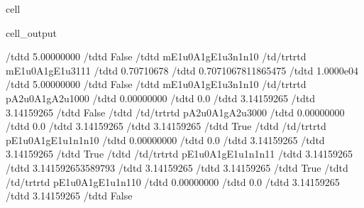 \documentclass[letterpaper,table,10pt,english]{jupyterBook}
\begin{document}
\begin{sphinxuseclass}{cell}
\begin{sphinxVerbatimOutput}
\begin{sphinxuseclass}{cell_output}
\begin{sphinxVerbatim}[commandchars=\\\{\}]
\PYGZlt{}/td\PYGZgt{}\PYGZlt{}td\PYGZgt{}  5.00000000 \PYGZlt{}/td\PYGZgt{}\PYGZlt{}td\PYGZgt{} False \PYGZlt{}/td\PYGZgt{}\PYGZlt{}td\PYGZgt{} m\PYGZus{}E1u\PYGZus{}0\PYGZus{}A1g\PYGZus{}E1u\PYGZus{}3\PYGZus{}n1\PYGZus{}n1\PYGZus{}0 \PYGZlt{}/td\PYGZgt{}\PYGZlt{}/tr\PYGZgt{}\PYGZlt{}tr\PYGZgt{}\PYGZlt{}td\PYGZgt{} m\PYGZus{}E1u\PYGZus{}0\PYGZus{}A1g\PYGZus{}E1u\PYGZus{}3\PYGZus{}1\PYGZus{}1\PYGZus{}1 \PYGZlt{}/td\PYGZgt{}\PYGZlt{}td\PYGZgt{}  0.70710678 \PYGZlt{}/td\PYGZgt{}\PYGZlt{}td\PYGZgt{} 0.7071067811865475 \PYGZlt{}/td\PYGZgt{}\PYGZlt{}td\PYGZgt{}  1.0000e\PYGZhy{}04 \PYGZlt{}/td\PYGZgt{}\PYGZlt{}td\PYGZgt{}  5.00000000 \PYGZlt{}/td\PYGZgt{}\PYGZlt{}td\PYGZgt{} False \PYGZlt{}/td\PYGZgt{}\PYGZlt{}td\PYGZgt{} m\PYGZus{}E1u\PYGZus{}0\PYGZus{}A1g\PYGZus{}E1u\PYGZus{}3\PYGZus{}n1\PYGZus{}n1\PYGZus{}0 \PYGZlt{}/td\PYGZgt{}\PYGZlt{}/tr\PYGZgt{}\PYGZlt{}tr\PYGZgt{}\PYGZlt{}td\PYGZgt{} p\PYGZus{}A2u\PYGZus{}0\PYGZus{}A1g\PYGZus{}A2u\PYGZus{}1\PYGZus{}0\PYGZus{}0\PYGZus{}0 \PYGZlt{}/td\PYGZgt{}\PYGZlt{}td\PYGZgt{}  0.00000000 \PYGZlt{}/td\PYGZgt{}\PYGZlt{}td\PYGZgt{} 0.0 \PYGZlt{}/td\PYGZgt{}\PYGZlt{}td\PYGZgt{} \PYGZhy{}3.14159265 \PYGZlt{}/td\PYGZgt{}\PYGZlt{}td\PYGZgt{}  3.14159265 \PYGZlt{}/td\PYGZgt{}\PYGZlt{}td\PYGZgt{} False \PYGZlt{}/td\PYGZgt{}\PYGZlt{}td\PYGZgt{}  \PYGZlt{}/td\PYGZgt{}\PYGZlt{}/tr\PYGZgt{}\PYGZlt{}tr\PYGZgt{}\PYGZlt{}td\PYGZgt{} p\PYGZus{}A2u\PYGZus{}0\PYGZus{}A1g\PYGZus{}A2u\PYGZus{}3\PYGZus{}0\PYGZus{}0\PYGZus{}0 \PYGZlt{}/td\PYGZgt{}\PYGZlt{}td\PYGZgt{}  0.00000000 \PYGZlt{}/td\PYGZgt{}\PYGZlt{}td\PYGZgt{} 0.0 \PYGZlt{}/td\PYGZgt{}\PYGZlt{}td\PYGZgt{} \PYGZhy{}3.14159265 \PYGZlt{}/td\PYGZgt{}\PYGZlt{}td\PYGZgt{}  3.14159265 \PYGZlt{}/td\PYGZgt{}\PYGZlt{}td\PYGZgt{} True \PYGZlt{}/td\PYGZgt{}\PYGZlt{}td\PYGZgt{}  \PYGZlt{}/td\PYGZgt{}\PYGZlt{}/tr\PYGZgt{}\PYGZlt{}tr\PYGZgt{}\PYGZlt{}td\PYGZgt{} p\PYGZus{}E1u\PYGZus{}0\PYGZus{}A1g\PYGZus{}E1u\PYGZus{}1\PYGZus{}n1\PYGZus{}n1\PYGZus{}0 \PYGZlt{}/td\PYGZgt{}\PYGZlt{}td\PYGZgt{}  0.00000000 \PYGZlt{}/td\PYGZgt{}\PYGZlt{}td\PYGZgt{} 0.0 \PYGZlt{}/td\PYGZgt{}\PYGZlt{}td\PYGZgt{} \PYGZhy{}3.14159265 \PYGZlt{}/td\PYGZgt{}\PYGZlt{}td\PYGZgt{}  3.14159265 \PYGZlt{}/td\PYGZgt{}\PYGZlt{}td\PYGZgt{} True \PYGZlt{}/td\PYGZgt{}\PYGZlt{}td\PYGZgt{}  \PYGZlt{}/td\PYGZgt{}\PYGZlt{}/tr\PYGZgt{}\PYGZlt{}tr\PYGZgt{}\PYGZlt{}td\PYGZgt{} p\PYGZus{}E1u\PYGZus{}0\PYGZus{}A1g\PYGZus{}E1u\PYGZus{}1\PYGZus{}n1\PYGZus{}n1\PYGZus{}1 \PYGZlt{}/td\PYGZgt{}\PYGZlt{}td\PYGZgt{}  3.14159265 \PYGZlt{}/td\PYGZgt{}\PYGZlt{}td\PYGZgt{} 3.141592653589793 \PYGZlt{}/td\PYGZgt{}\PYGZlt{}td\PYGZgt{} \PYGZhy{}3.14159265 \PYGZlt{}/td\PYGZgt{}\PYGZlt{}td\PYGZgt{}  3.14159265 \PYGZlt{}/td\PYGZgt{}\PYGZlt{}td\PYGZgt{} True \PYGZlt{}/td\PYGZgt{}\PYGZlt{}td\PYGZgt{}  \PYGZlt{}/td\PYGZgt{}\PYGZlt{}/tr\PYGZgt{}\PYGZlt{}tr\PYGZgt{}\PYGZlt{}td\PYGZgt{} p\PYGZus{}E1u\PYGZus{}0\PYGZus{}A1g\PYGZus{}E1u\PYGZus{}1\PYGZus{}n1\PYGZus{}1\PYGZus{}0 \PYGZlt{}/td\PYGZgt{}\PYGZlt{}td\PYGZgt{}  0.00000000 \PYGZlt{}/td\PYGZgt{}\PYGZlt{}td\PYGZgt{} 0.0 \PYGZlt{}/td\PYGZgt{}\PYGZlt{}td\PYGZgt{} \PYGZhy{}3.14159265 \PYGZlt{}/td\PYGZgt{}\PYGZlt{}td\PYGZgt{}  3.14159265 \PYGZlt{}/td\PYGZgt{}\PYGZlt{}td\PYGZgt{} False 
\end{sphinxVerbatim}
\end{sphinxuseclass}
\end{sphinxVerbatimOutput}
\end{sphinxuseclass}
\end{document}
